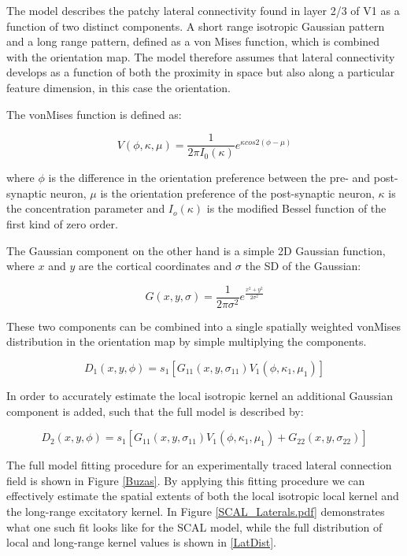 The model describes the patchy lateral connectivity found in layer 2/3
of V1 as a function of two distinct components. A short range
isotropic Gaussian pattern and a long range pattern, defined as a von
Mises function, which is combined with the orientation map. The model
therefore assumes that lateral connectivity develops as a function of
both the proximity in space but also along a particular feature
dimension, in this case the orientation.

The vonMises function is defined as:

\begin{equation}
V(\phi, \kappa, \mu) = \frac{1}{2 \pi I_0(\kappa)} e^{\kappa cos 2(\phi - \mu)}
\end{equation}

where $\phi$ is the difference in the orientation preference between
the pre- and post-synaptic neuron, $\mu$ is the orientation preference
of the post-synaptic neuron, $\kappa$ is the concentration parameter
and $I_o(\kappa)$ is the modified Bessel function of the first kind of
zero order.

The Gaussian component on the other hand is a simple 2D Gaussian
function, where $x$ and $y$ are the cortical coordinates and $\sigma$
the SD of the Gaussian:

\begin{equation}
G(x, y, \sigma) = \frac{1}{2 \pi \sigma^2} e^{\frac{x^2+y^2}{2
    \sigma^2}}
\end{equation}

These two components can be combined into a single spatially weighted
vonMises distribution in the orientation map by simple multiplying the
components.

\begin{equation}
D_1(x, y, \phi) = s_1 [G_{11}(x, y, \sigma_{11}) V_1(\phi, \kappa_1, \mu_1)]
\end{equation}

In order to accurately estimate the local isotropic kernel an
additional Gaussian component is added, such that the full model is
described by:

\begin{equation}
D_2(x, y, \phi) = s_1 [G_{11}(x, y, \sigma_{11}) V_1(\phi, \kappa_1, \mu_1) + G_{22}(x, y, \sigma_{22})]
\end{equation}

The full model fitting procedure for an experimentally traced lateral
connection field is shown in Figure \ref{Buzas}. By applying this
fitting procedure we can effectively estimate the spatial extents of
both the local isotropic local kernel and the long-range excitatory
kernel. In Figure \ref{SCAL_Laterals.pdf} demonstrates what one such
fit looks like for the SCAL model, while the full distribution of
local and long-range kernel values is shown in \ref{LatDist}.

